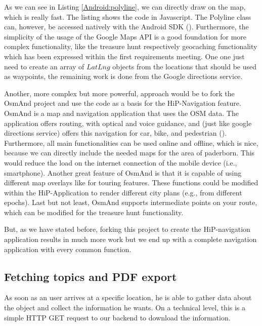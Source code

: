As we can see in Listing \ref{Android:polyline}, we can directly draw on the map, which is really fast. The listing shows the code in Javascript. The Polyline class can, however, be accessed natively with the Android SDK (\cite{GooglePolylineNative}). Furthermore, the simplicity of the usage of the Google Maps API is a good foundation for more complex functionality, like the treasure hunt respectively geocaching functionality which has been expressed within the first requirements meeting. One one just need to create an array of $LatLng$ objects from the locations that should be used as waypoints, the remaining work is done from the Google directions service.  

Another, more complex but more powerful, approach would be to fork the \ac{OsmAnd} project and use the code as a basis for the HiP-Navigation feature. \ac{OsmAnd} is a map and navigation application that uses the \ac{OSM} data. The application offers routing, with optical and voice guidance, and (just like google directions service) offers this navigation for car, bike, and pedestrian (\cite{osmand}). Furthermore, all main functionalities can be used online and offline, which is nice, because we can directly include the needed maps for the area of paderborn. This would reduce the load on the internet connection of the mobile device (i.e., smartphone). Another great feature of \ac{OsmAnd} is that it is capable of using different map overlays like for touring features. These functions could be modified within the HiP-Application to render different city plans (e.g., from different epochs). Last but not least, \ac{OsmAnd} supports intermediate points on your route, which can be modified for the treasure hunt functionality.


But, as we have stated before, forking this project to create the \ac{HiP}-navigation application results in much more work but we end up with a complete navigation application with every common function. 

\subsection{Fetching topics and PDF export}
As soon as an user arrives at a specific location, he is able to gather data about the object and collect the information he wants. On a technical level, this is a simple \ac{HTTP} GET request to our backend to download the information.

